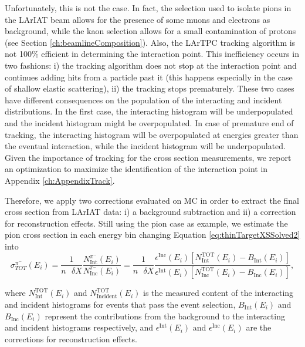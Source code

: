 Unfortunately, this is not the case. In fact, the selection used to isolate pions in the LArIAT beam allows for the presence of some muons and electrons as background, while the kaon selection allows for a small contamination of protons (see Section \ref{ch:beamlineComposition}). Also, the LArTPC tracking algorithm is not 100\% efficient in determining the interaction point. This inefficiency occurs in two fashions: i) the tracking algorithm does not stop at the interaction point and continues adding hits from a particle past it (this happens especially in the case of shallow elastic scattering), ii) the tracking stops prematurely. These two cases have different consequences on the population of the interacting and incident distributions. In the first case, the interacting histogram will be underpopulated and the incident histogram might be overpopulated. In case of premature end of tracking, the interacting histogram will be overpopulated at energies greater than the eventual interaction, while the incident histogram will be underpopulated. Given the importance of tracking for the cross section measurements,  we report an optimization to maximize the identification of the interaction point in Appendix \ref{ch:AppendixTrack}.

Therefore, we apply two corrections evaluated on MC in order to extract the final cross section from LArIAT data: i) a background subtraction and ii) a correction for reconstruction effects. 
Still using the pion case as example, we estimate the pion cross section in each energy bin changing  Equation \ref{eq:thinTargetXSSolved2} into
\begin{equation}
 \sigma^{\pi^-}_{TOT}(E_{i})  =\frac{1}{n\text{ } \delta X}\frac{N^{\pi^-}_{ \text{Int}} (E_{i})}{N^{\pi^-}_{ \text{Inc}}(E_{i})} = \frac{1}{n \text{ }\delta X}\frac{ \epsilon^{\text{Inc}}(E_i) [ N^{ \text{TOT}}_{ \text{Int}} (E_{i}) - B_{ \text{Int}} (E_i)] }{   \epsilon^{\text{Int}}(E_i) [N^{ \text{TOT}}_{ \text{Inc}}(E_{i}) - B_{ \text{Inc}} (E_i)]},
\label{eq:True}
\end{equation}


 
where  $N^{\text{TOT}}_{\text{Int}} (E_{i})$ and $N^{\text{TOT}}_{\text{Incident}} (E_{i})$ is the measured content of the interacting and incident histograms for events that pass the event selection, $B_{\text{Int}} (E_i)$ and $B_{\text{Inc}} (E_i)$ represent the contributions from the background to the interacting and incident histograms respectively, and  $\epsilon^{\text{Int}}(E_i)$ and  $\epsilon^{\text{Inc}}(E_i)$ are the corrections for reconstruction effects.

